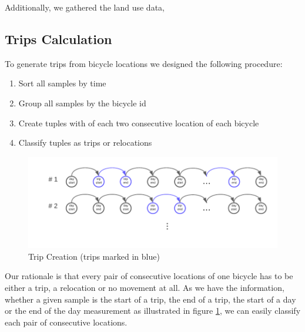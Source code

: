 Additionally, we gathered the land use data, 



\subsection{Trips Calculation}
To generate trips from bicycle locations we designed the following procedure:
\begin{enumerate}
    \item Sort all samples by time
    \item Group all samples by the bicycle id
    \item Create tuples with of each two consecutive location of each bicycle
    \item Classify tuples as trips or relocations
\end{enumerate}


\begin{figure}[htp]
    \centering
    \includegraphics{Figures/trip_creation_diagram.pdf}
    \caption{Trip Creation (trips marked in blue)}
    \label{fig:trip_creation}
\end{figure}

Our rationale is that every pair of consecutive locations of one bicycle has to be either a trip, a relocation or no movement at all.
As we have the information, whether a given sample is the start of a trip, the end of a trip, the start of a day or the end of the day measurement as illustrated in figure \ref{fig:trip_creation}, we can easily classify each pair of consecutive locations.

